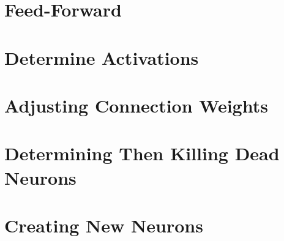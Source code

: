 \documentclass{article} %
\begin{document}
    \section{Feed-Forward}
    \section{Determine Activations}
    \section{Adjusting Connection Weights}
    \section{Determining Then Killing Dead Neurons}
    \section{Creating New Neurons}
\end{document}
